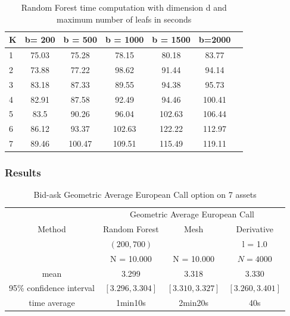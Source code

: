 \documentclass[english,11pt,openany]{report}
\theoremstyle{definition}
\theoremstyle{plain}
\theoremstyle{definition}
\begin{document}
\begin{table}[H]
	\centering
	
	\begin{tabular}{|l|c|c|c|c|c|c|}\hline
		K & b= 200   & b = 500 & b = 1000  & b = 1500   & b=2000    \\ \hline
		1 & 75.03 &  75.28 &  78.15 &  80.18 &  83.77 \\ \hline
		2 & 73.88 &  77.22 &  98.62 &  91.44 &  94.14 \\ \hline
	3 & 	83.18 &  87.33 &  89.55 &  94.38 &  95.73 \\ \hline
	4 & 	82.91 &  87.58 &  92.49 &  94.46 & 100.41 \\ \hline
	5 & 	83.5  &  90.26 &  96.04 & 102.63 & 106.44 \\ \hline
	6 & 	86.12 &  93.37 & 102.63 & 122.22 & 112.97 \\ \hline
	7 & 	89.46 & 100.47 & 109.51 & 115.49 & 119.11 \\ \hline
		\hline
	\end{tabular}
	\caption{Random Forest time computation with dimension d and maximum number of leafs in seconds \label{table:high_dim_time}}
\end{table}

\subsubsection{Results}

\begin{table}[H]
	\centering
	\caption{Bid-ask  Geometric Average European Call option on 7 assets}\label{table:call7D}
	\begin{tabular}{*4c}
		\toprule
		& \multicolumn{3}{c}{Geometric Average European Call} \\
	Method & Random Forest   & Mesh & Derivative \\  
	
	& $(200, 700)$ &    &  l = 1.0 \\
	& N = 10.000 & N = 10.000      &   $N = 4 000$\\
	\midrule
	mean &     3.299   &  3.318  &  3.330 \\ 
	95\% confidence interval &   $[3.296, 3.304]$   & $[3.310, 3.327]$ & $[3.260, 3.401]$  \\
	time average &    1min10s  & 2min20s & 40s \\
		\bottomrule
	\end{tabular}
\end{table}
\end{document}
